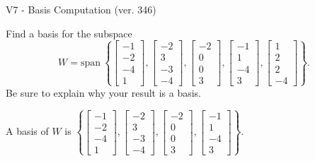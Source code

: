 \begin{exercise}
  \begin{exerciseTitle}V7 - Basis Computation (ver. 346)\end{exerciseTitle}
  \begin{exerciseStatement}
    Find a basis for the subspace 
\[W=\mathrm{span}\ \left\{\left[\begin{array}{r}
-1 \\
-2 \\
-4 \\
1
\end{array}\right] , \left[\begin{array}{r}
-2 \\
3 \\
-3 \\
-4
\end{array}\right] , \left[\begin{array}{r}
-2 \\
0 \\
0 \\
3
\end{array}\right] , \left[\begin{array}{r}
-1 \\
1 \\
-4 \\
3
\end{array}\right] , \left[\begin{array}{r}
1 \\
2 \\
2 \\
-4
\end{array}\right]\right\}.\]
 Be sure to explain why your result is a basis.


  \end{exerciseStatement}
  \begin{exerciseAnswer}
   A basis of \(W\) is  \(\left\{\left[\begin{array}{r}
-1 \\
-2 \\
-4 \\
1
\end{array}\right] , \left[\begin{array}{r}
-2 \\
3 \\
-3 \\
-4
\end{array}\right] , \left[\begin{array}{r}
-2 \\
0 \\
0 \\
3
\end{array}\right] , \left[\begin{array}{r}
-1 \\
1 \\
-4 \\
3
\end{array}\right]\right\}\).
  


  \end{exerciseAnswer}
\end{exercise}